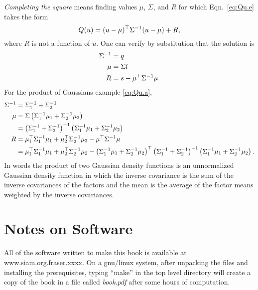 \emph{Completing the square} means finding values $\mu$, $\Sigma$, and
$R$ for which Eqn.~\eqref{eq:Qu.e} takes the form
\begin{equation}
  \label{eq:Qu.f}
  Q(u) = (u - \mu)^\top \Sigma^{-1} (u - \mu) + R,
\end{equation}
where $R$ is not a function of $u$.  One can verify by substitution
that the solution is
\begin{align*}
  \Sigma^{-1} &= q\\
  \mu &= \Sigma l\\
  R &= s -  \mu^\top \Sigma^{-1} \mu.
\end{align*}
For the product of Gaussians example \eqref{eq:Qu.a},
\begin{align*}
  \Sigma^{-1} &= \Sigma_1^{-1} + \Sigma_2^{-1} \\
  \mu &= \Sigma \left( \Sigma_1^{-1} \mu_1 + \Sigma_2^{-1} \mu_2
  \right) \\
  &= \left( \Sigma_1^{-1} + \Sigma_2^{-1} \right)^{-1} \left(
  \Sigma_1^{-1} \mu_1 + \Sigma_2^{-1} \mu_2  \right) \\
  R &= \mu_1^\top \Sigma_1^{-1} \mu_1 + \mu_2^\top
  \Sigma_2^{-1} \mu_2 -  \mu^\top \Sigma^{-1} \mu \\
  &= \mu_1^\top \Sigma_1^{-1} \mu_1 + \mu_2^\top
  \Sigma_2^{-1} \mu_2 - \left( \Sigma_1^{-1} \mu_1 + \Sigma_2^{-1}
  \mu_2  \right) ^\top \left( \Sigma_1^{-1} + \Sigma_2^{-1}
  \right)^{-1} \left( \Sigma_1^{-1} \mu_1 + \Sigma_2^{-1} \mu_2
  \right).
\end{align*}
In words the product of two Gaussian density functions is an
unnormalized Gaussian density function in which the inverse covariance
is the sum of the inverse covariances of the factors and the mean is
the average of the factor means weighted by the inverse covariances.


\chapter{Notes on Software}
\label{cha:Software}

All of the software written to make this book is available at
www.siam.org.fraser.xxxx.  On a gnu/linux system, after unpacking the
files and installing the prerequisites, typing ``make'' in the top
level directory will create a copy of the book in a file called
\emph{book.pdf} after some hours of computation.

